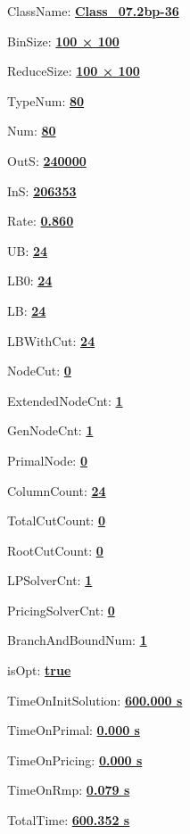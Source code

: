 \documentclass[11pt]{article}
\begin{document}
\pagestyle{empty}


ClassName: \underline{\textbf{Class_07.2bp-36}}
\par
BinSize: \underline{\textbf{100 × 100}}
\par
ReduceSize: \underline{\textbf{100 × 100}}
\par
TypeNum: \underline{\textbf{80}}
\par
Num: \underline{\textbf{80}}
\par
OutS: \underline{\textbf{240000}}
\par
InS: \underline{\textbf{206353}}
\par
Rate: \underline{\textbf{0.860}}
\par
UB: \underline{\textbf{24}}
\par
LB0: \underline{\textbf{24}}
\par
LB: \underline{\textbf{24}}
\par
LBWithCut: \underline{\textbf{24}}
\par
NodeCut: \underline{\textbf{0}}
\par
ExtendedNodeCnt: \underline{\textbf{1}}
\par
GenNodeCnt: \underline{\textbf{1}}
\par
PrimalNode: \underline{\textbf{0}}
\par
ColumnCount: \underline{\textbf{24}}
\par
TotalCutCount: \underline{\textbf{0}}
\par
RootCutCount: \underline{\textbf{0}}
\par
LPSolverCnt: \underline{\textbf{1}}
\par
PricingSolverCnt: \underline{\textbf{0}}
\par
BranchAndBoundNum: \underline{\textbf{1}}
\par
isOpt: \underline{\textbf{true}}
\par
TimeOnInitSolution: \underline{\textbf{600.000 s}}
\par
TimeOnPrimal: \underline{\textbf{0.000 s}}
\par
TimeOnPricing: \underline{\textbf{0.000 s}}
\par
TimeOnRmp: \underline{\textbf{0.079 s}}
\par
TotalTime: \underline{\textbf{600.352 s}}
\par
\newpage


\end{document}
